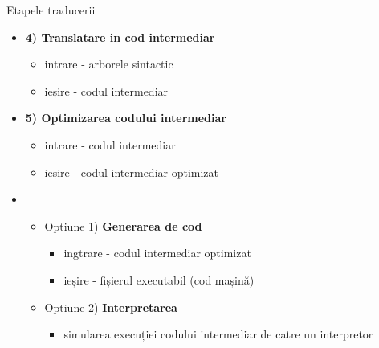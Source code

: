 \documentclass[pdf]{beamer}
\begin{document}
\begin{frame}{Etapele traducerii}
\begin{itemize}
\item
\textbf{4) Translatare in cod intermediar}
\begin{itemize}
\item
intrare - arborele sintactic

\item
ieșire - codul intermediar
\end{itemize}

\item
\textbf{5) Optimizarea codului intermediar}
\begin{itemize}
\item
intrare - codul intermediar

\item
ieșire - codul intermediar optimizat
\end{itemize}

\item
\begin{itemize}
\item
Optiune 1) \textbf{Generarea de cod} 
\begin{itemize}
\item
ingtrare - codul intermediar optimizat

\item
ieșire - fișierul executabil (cod mașină)
\end{itemize}

\item
Optiune 2) \textbf{Interpretarea}
\begin{itemize}
\item
simularea execuției codului intermediar de catre un interpretor
\end{itemize}
\end{itemize}
\end{itemize}
\end{frame}
\end{document}
